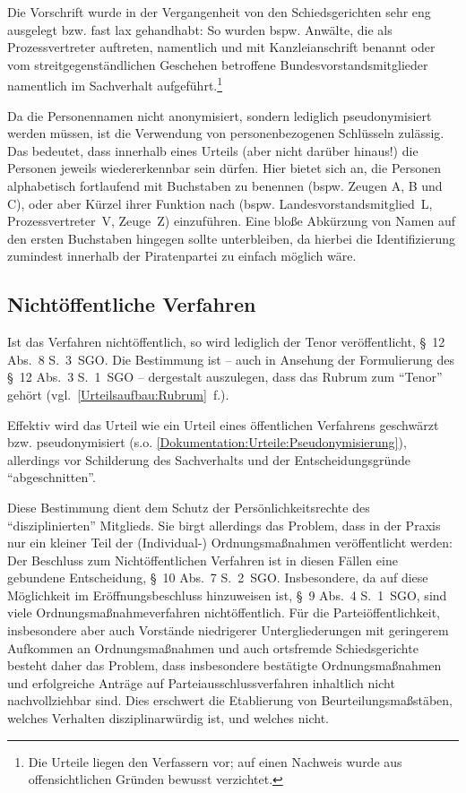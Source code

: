 Die Vorschrift wurde in der Vergangenheit von den Schiedsgerichten sehr eng ausgelegt bzw. fast lax gehandhabt:
So wurden bspw. Anwälte, die als Prozessvertreter auftreten, namentlich und mit Kanzleianschrift benannt oder vom streitgegenständlichen Geschehen betroffene Bundesvorstandsmitglieder namentlich im Sachverhalt aufgeführt.\footnote{Die Urteile liegen den Verfassern vor; auf einen Nachweis wurde aus offensichtlichen Gründen bewusst verzichtet.}

Da die Personennamen nicht anonymisiert, sondern lediglich pseudonymisiert werden müssen, ist die Verwendung von personenbezogenen Schlüsseln zulässig.
Das bedeutet, dass innerhalb eines Urteils (aber nicht darüber hinaus!) die Personen jeweils wiedererkennbar sein dürfen.
Hier bietet sich an, die Personen alphabetisch fortlaufend mit Buchstaben zu benennen (bspw. Zeugen A, B und C), oder aber Kürzel ihrer Funktion nach (bspw. Landesvorstandsmitglied~L, Prozessvertreter~V, Zeuge~Z) einzuführen.
Eine bloße Abkürzung von Namen auf den ersten Buchstaben hingegen sollte unterbleiben, da hierbei die Identifizierung zumindest innerhalb der Piratenpartei zu einfach möglich wäre.

\subsection{Nichtöffentliche Verfahren}
\label{Dokumentation:Urteile:Nichtöffentlich}
Ist das Verfahren nichtöffentlich, so wird lediglich der Tenor veröffentlicht, \S~12 Abs.~8 S.~3~SGO.
Die Bestimmung ist -- auch in Ansehung der Formulierung des \S~12 Abs.~3 S.~1~SGO -- dergestalt auszulegen, dass das Rubrum zum \enquote{Tenor} gehört (vgl.~\ref{Urteilsaufbau:Rubrum}~f.).

Effektiv wird das Urteil wie ein Urteil eines öffentlichen Verfahrens geschwärzt bzw. pseudonymisiert (s.o. \ref{Dokumentation:Urteile:Pseudonymisierung}), allerdings vor Schilderung des Sachverhalts und der Entscheidungsgründe \enquote{abgeschnitten}.

Diese Bestimmung dient dem Schutz der Persönlichkeitsrechte des \enquote{disziplinierten} Mitglieds.
Sie birgt allerdings das Problem, dass in der Praxis nur ein kleiner Teil der (Individual-) Ordnungsmaßnahmen veröffentlicht werden:
Der Beschluss zum Nichtöffentlichen Verfahren ist in diesen Fällen eine gebundene Entscheidung, \S~10 Abs.~7 S.~2~SGO.
Insbesondere, da auf diese Möglichkeit im Eröffnungsbeschluss hinzuweisen ist, \S~9 Abs.~4 S.~1~SGO, sind viele Ordnungsmaßnahmeverfahren nichtöffentlich.
Für die Parteiöffentlichkeit, insbesondere aber auch Vorstände niedrigerer Untergliederungen mit geringerem Aufkommen an Ordnungsmaßnahmen und auch ortsfremde Schiedsgerichte besteht daher das Problem, dass insbesondere bestätigte Ordnungsmaßnahmen und erfolgreiche Anträge auf Parteiausschlussverfahren inhaltlich nicht nachvollziehbar sind.
Dies erschwert die Etablierung von Beurteilungsmaßstäben, welches Verhalten disziplinarwürdig ist, und welches nicht.

